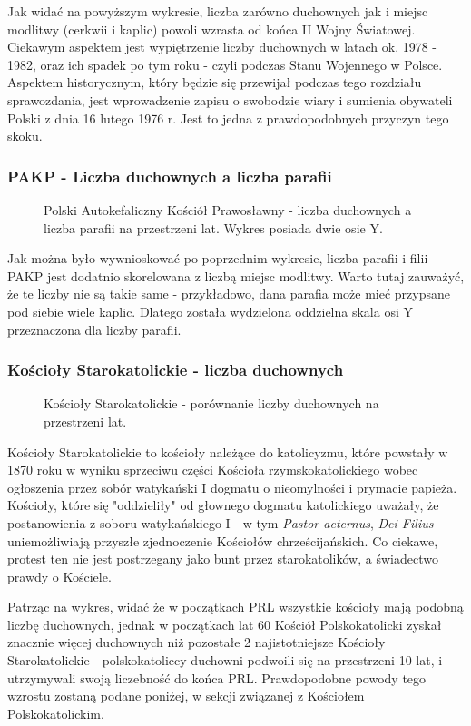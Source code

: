 \documentclass[12pt]{article}
\begin{document}
Jak widać na powyższym wykresie, liczba zarówno duchownych jak i miejsc modlitwy (cerkwii i kaplic) powoli wzrasta od końca II Wojny Światowej. Ciekawym aspektem jest wypiętrzenie liczby duchownych 
w latach ok. 1978 - 1982, oraz ich spadek po tym roku - czyli podczas Stanu Wojennego w Polsce. Aspektem historycznym, który będzie się przewijał podczas tego rozdziału sprawozdania, jest wprowadzenie zapisu 
o swobodzie wiary i sumienia obywateli Polski z dnia 16 lutego 1976 r. Jest to jedna z prawdopodobnych przyczyn tego skoku.

\subsubsection{PAKP - Liczba duchownych a liczba parafii}
\begin{figure}[H]
    
    \caption{Polski Autokefaliczny Kościół Prawosławny - liczba duchownych a liczba parafii na przestrzeni lat. Wykres posiada dwie osie Y.}
\end{figure}
Jak można było wywnioskować po poprzednim wykresie, liczba parafii i filii PAKP jest dodatnio skorelowana z liczbą miejsc modlitwy. Warto tutaj zauważyć, że te liczby nie są takie same - 
przykładowo, dana parafia może mieć przypsane pod siebie wiele kaplic. Dlatego została wydzielona oddzielna skala osi Y przeznaczona dla liczby parafii.


\subsubsection{Kościoły Starokatolickie - liczba duchownych}
\begin{figure}[H]
    
    \caption{Kościoły Starokatolickie - porównanie liczby duchownych na przestrzeni lat.}
\end{figure}
Kościoły Starokatolickie to kościoły należące do katolicyzmu, które powstały w 1870 roku w wyniku sprzeciwu części Kościoła rzymskokatolickiego wobec ogłoszenia przez sobór watykański I 
dogmatu o nieomylności i prymacie papieża. Kościoły, które się "oddzieliły" od głownego dogmatu katolickiego uważały, że postanowienia z soboru watykańskiego I - w tym 
\textit{Pastor aeternus}, \textit{Dei Filius} uniemożliwiają przyszłe zjednoczenie Kościołów chrześcijańskich. Co ciekawe, protest ten nie jest postrzegany jako bunt przez starokatolików, 
a świadectwo prawdy o Kościele. 

Patrząc na wykres, widać że w początkach PRL wszystkie kościoły mają podobną liczbę duchownych, jednak w początkach lat 60 Kościół Polskokatolicki zyskał znacznie więcej duchownych niż pozostałe 2
najistotniejsze Kościoły Starokatolickie - polskokatoliccy duchowni podwoili się na przestrzeni 10 lat, i utrzymywali swoją liczebność do końca PRL.
Prawdopodobne powody tego wzrostu zostaną podane poniżej, w sekcji związanej z Kościołem Polskokatolickim.
\end{document}
